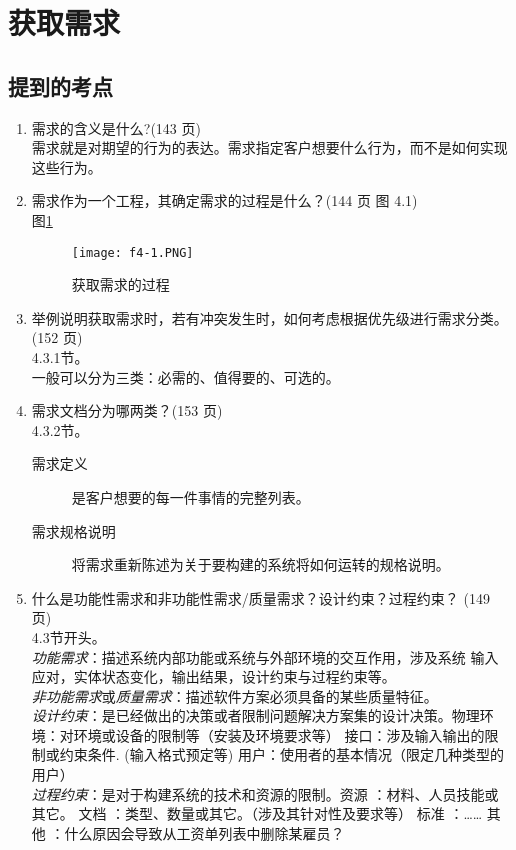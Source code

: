 \documentclass[14pt, letterpaper, UTF8, fontset=windowsnew, heading=true]{article}
\begin{document}
\section{获取需求}

\subsection{提到的考点}

\begin{enumerate}
	\item 需求的含义是什么?(143 页) \\
	需求就是对期望的行为的表达。需求指定客户想要什么行为，而不是如何实现这些行为。
	
	\item 需求作为一个工程，其确定需求的过程是什么？(144 页 图 4.1) \\图\ref{fig:collectrequirements}
	\begin{figure}[h]
		\centering
		\texttt{[image: f4-1.PNG]}
		\caption{获取需求的过程}
		\label{fig:collectrequirements}
	\end{figure}

	\item 举例说明获取需求时，若有冲突发生时，如何考虑根据优先级进行需求分类。(152 页) \\ 4.3.1节。\\
	一般可以分为三类：必需的、值得要的、可选的。
	

	\item 需求文档分为哪两类？(153 页) \\ 4.3.2节。\\
	\begin{description}
		\item[需求定义] 是客户想要的每一件事情的完整列表。
		\item[需求规格说明] 将需求重新陈述为关于要构建的系统将如何运转的规格说明。
	\end{description}
	
	\item 什么是功能性需求和非功能性需求/质量需求？设计约束？过程约束？ (149 页)
	\\ 4.3节开头。 \\
	\emph{功能需求}：描述系统内部功能或系统与外部环境的交互作用，涉及系统
	输入应对，实体状态变化，输出结果，设计约束与过程约束等。
	\\ \emph{非功能需求}或\emph{质量需求}：描述软件方案必须具备的某些质量特征。
	\\ \emph{设计约束}：是已经做出的决策或者限制问题解决方案集的设计决策。物理环境：对环境或设备的限制等（安装及环境要求等）
	接口：涉及输入输出的限制或约束条件. (输入格式预定等)   
	用户：使用者的基本情况（限定几种类型的用户）
	\\ \emph{过程约束}：是对于构建系统的技术和资源的限制。资源 ：材料、人员技能或其它。
	文档 ：类型、数量或其它。（涉及其针对性及要求等）
	标准 ：……
	其他 ：什么原因会导致从工资单列表中删除某雇员？
	

\end{enumerate}
\end{document}
